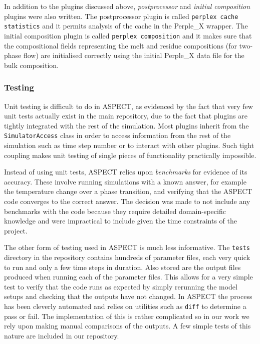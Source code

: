 In addition to the plugins discussed above, \textit{postprocessor} and \textit{initial composition} plugins were also written.
The postprocessor plugin is called \texttt{perplex cache statistics} and it permits analysis of the cache in the Perple\_X wrapper.
The initial composition plugin is called \texttt{perplex composition} and it makes sure that the compositional fields representing the melt and residue compositions (for two-phase flow) are initialised correctly using the initial Perple\_X data file for the bulk composition.

\subsubsection{Testing}

Unit testing is difficult to do in ASPECT, as evidenced by the fact that very few unit tests actually exist in the main repository, due to the fact that plugins are tightly integrated with the rest of the simulation.
Most plugins inherit from the \texttt{SimulatorAccess} class in order to access information from the rest of the simulation such as time step number or to interact with other plugins.
Such tight coupling makes unit testing of single pieces of functionality practically impossible.

Instead of using unit tests, ASPECT relies upon \textit{benchmarks} for evidence of its accuracy.
These involve running simulations with a known answer, for example the temperature change over a phase transition, and verifying that the ASPECT code converges to the correct answer.
The decision was made to not include any benchmarks with the code because they require detailed domain-specific knowledge and were impractical to include given the time constraints of the project.

The other form of testing used in ASPECT is much less informative.
The \texttt{tests} directory in the repository contains hundreds of parameter files, each very quick to run and only a few time steps in duration.
Also stored are the output files produced when running each of the parameter files.
This allows for a very simple test to verify that the code runs as expected by simply rerunning the model setups and checking that the outputs have not changed.
In ASPECT the process has been cleverly automated and relies on utilities such as \texttt{diff} to determine a pass or fail.
The implementation of this is rather complicated so in our work we rely upon making manual comparisons of the outputs.
A few simple tests of this nature are included in our repository.
